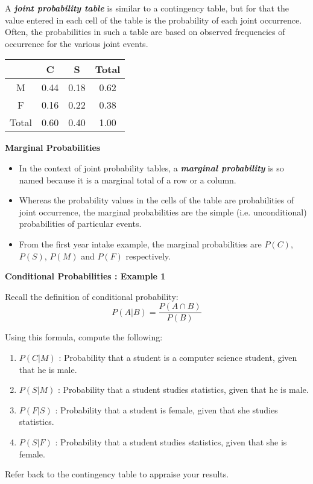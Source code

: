 A \textbf{\emph{joint probability table}} is similar to a contingency table, but for that the value entered in
each cell of the table is the probability of each joint occurrence. Often, the probabilities in such a table are based
on observed frequencies of occurrence for the various joint events.
\begin{center}
\begin{tabular}{|c|c|c|c|}
\hline
& C & S & Total \\ \hline
M & 0.44 & 0.18 & 0.62 \\ \hline
F & 0.16 & 0.22 & 0.38 \\ \hline
Total & 0.60 & 0.40 & 1.00 \\ \hline
\end{tabular}
\end{center}

\noindent \textbf{Marginal Probabilities}
\begin{itemize}
\item In the context of joint probability tables, a  \textbf{\emph{marginal probability}} is so named because it is a marginal total of
a row or a column. \item Whereas the probability values in the cells of the table are probabilities of joint occurrence, the marginal
probabilities are the simple (i.e. unconditional) probabilities of particular events.
\item From the first year intake example, the marginal probabilities are $P(C)$, $P(S)$, $P(M)$ and $P(F)$ respectively.
\end{itemize}


\noindent \textbf{Conditional Probabilities : Example 1}

Recall the definition of conditional probability:
\[ P(A|B) = \frac{P(A \cap B)}{P(B)} \]

Using this formula, compute the following:
\begin{enumerate}
\item $P(C|M)$ : Probability that a student is a computer science student, given that he is male.
\item $P(S|M)$ : Probability that a student studies statistics, given that he is male.
\item $P(F|S)$ : Probability that a student is female, given that she studies statistics.
\item $P(S|F)$ : Probability that a student studies statistics, given that she is female.
\end{enumerate}
Refer back to the contingency table to appraise your results.

